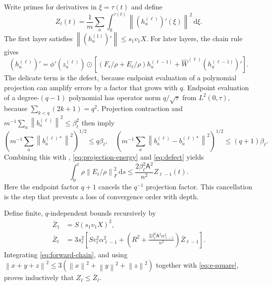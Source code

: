 \documentclass[11pt]{article}
\theoremstyle{definition}
\theoremstyle{remark}
\newcommand{\norm}[1]{\left\lVert #1\right\rVert}
\newcommand{\od}{\mathbin{\odot}}
\newcommand{\dd}{\,\mathrm{d}}
\begin{document}
Write primes for derivatives in $\xi=\tau(t)$ and define
\[
 Z_\ell(t)=\frac1m\sum_a\int_0^{\tau(t)}
 \norm{(h_a^{(\ell)})'(\xi)}^2\dd\xi.
\]
The first layer satisfies $\norm{(h_a^{(1)})'}\le s_1v_1X$.  For later layers,
the chain rule gives
\begin{equation}
 (h_a^{(\ell)})'=\phi'(z_a^{(\ell)})\od
 \left[(F_\ell/\rho+E_\ell/\rho)h_a^{(\ell-1)}
 +\widehat W^{(\ell)}(h_a^{(\ell-1)})'\right].       \label{eq:forward-chain}
\end{equation}
The delicate term is the defect, because endpoint evaluation of a polynomial
projection can amplify errors by a factor that grows with $q$.  Endpoint
evaluation of a degree-$(q-1)$ polynomial has operator norm $q/\sqrt\tau$ from
$L^2(0,\tau)$, because $\sum_{k<q}(2k+1)=q^2$.  Projection contraction and
$m^{-1}\sum_a\norm{b^{(\ell)}_a}^2\le\beta_\ell^2$ then imply
\[
 \left(m^{-1}\sum_a\norm{b^{(\ell)*}_a}^2\right)^{1/2}\le q\beta_\ell,
 \quad
 \left(m^{-1}\sum_a\norm{b^{(\ell)}_a-b^{(\ell)*}_a}^2\right)^{1/2}
 \le(q+1)\beta_\ell.
\]
Combining this with , \eqref{eq:projection-energy} and
\eqref{eq:defect} yields
\begin{equation}
 \int_0^t\rho\norm{E_\ell/\rho}_F^2\dd s
 \le\frac{2\beta_\ell^2\mathsf A^2}{n^2}
 Z_{\ell-1}(t).                                      \label{eq:e-square}
\end{equation}
Here the endpoint factor $q+1$ cancels the $q^{-1}$ projection factor.  This
cancellation is the step that prevents a loss of convergence order with depth.

Define finite, $q$-independent bounds recursively by
\begin{align}
 \overline Z_1&=S(s_1v_1X)^2,\nonumber\\
 \overline Z_\ell&=3s_\ell^2\left[
 S v_\ell^2\alpha_{\ell-1}^2+
 \left(R^2+\frac{2\beta_\ell^2\mathsf A^2\alpha_{\ell-1}^2}{n^2}\right)
 \overline Z_{\ell-1}\right].                       \label{eq:z-recursion}
\end{align}
Integrating \eqref{eq:forward-chain}, and using
$\norm{x+y+z}^2\le3(\norm{x}^2+\norm{y}^2+\norm{z}^2)$ together with
\eqref{eq:e-square}, proves inductively that $Z_\ell\le\overline Z_\ell$.
\end{document}
